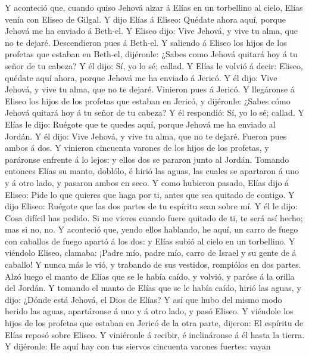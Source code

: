  Y aconteció que, cuando quiso Jehová alzar á Elías en un
torbellino al cielo, Elías venía con Eliseo de Gilgal.  Y
dijo Elías á Eliseo: Quédate ahora aquí, porque Jehová me ha enviado á
Beth-el. Y Eliseo dijo: Vive Jehová, y vive tu alma, que no te dejaré.
Descendieron pues á Beth-el.  Y saliendo á Eliseo los
hijos de los profetas que estaban en Beth-el, dijéronle: ¿Sabes como
Jehová quitará hoy á tu señor de tu cabeza? Y él dijo: Sí, yo lo sé;
callad.  Y Elías le volvió á decir: Eliseo, quédate aquí
ahora, porque Jehová me ha enviado á Jericó. Y él dijo: Vive Jehová, y
vive tu alma, que no te dejaré. Vinieron pues á Jericó.  Y
llegáronse á Eliseo los hijos de los profetas que estaban en Jericó, y
dijéronle: ¿Sabes cómo Jehová quitará hoy á tu señor de tu cabeza? Y él
respondió: Sí, yo lo sé; callad.  Y Elías le dijo: Ruégote
que te quedes aquí, porque Jehová me ha enviado al Jordán. Y él dijo:
Vive Jehová, y vive tu alma, que no te dejaré. Fueron pues ambos á dos.
 Y vinieron cincuenta varones de los hijos de los
profetas, y paráronse enfrente á lo lejos: y ellos dos se pararon junto
al Jordán.  Tomando entonces Elías su manto, doblólo, é
hirió las aguas, las cuales se apartaron á uno y á otro lado, y pasaron
ambos en seco.  Y como hubieron pasado, Elías dijo á
Eliseo: Pide lo que quieres que haga por ti, antes que sea quitado de
contigo. Y dijo Eliseo: Ruégote que las dos partes de tu espíritu sean
sobre mí.  Y él le dijo: Cosa difícil has pedido. Si me
vieres cuando fuere quitado de ti, te será así hecho; mas si no, no.
 Y aconteció que, yendo ellos hablando, he aquí, un carro
de fuego con caballos de fuego apartó á los dos: y Elías subió al cielo
en un torbellino.  Y viéndolo Eliseo, clamaba: ¡Padre
mío, padre mío, carro de Israel y su gente de á caballo! Y nunca más le
vió, y trabando de sus vestidos, rompiólos en dos partes.
 Alzó luego el manto de Elías que se le había caído, y
volvió, y paróse á la orilla del Jordán.  Y tomando el
manto de Elías que se le había caído, hirió las aguas, y dijo: ¿Dónde
está Jehová, el Dios de Elías? Y así que hubo del mismo modo herido las
aguas, apartáronse á uno y á otro lado, y pasó Eliseo.  Y
viéndole los hijos de los profetas que estaban en Jericó de la otra
parte, dijeron: El espíritu de Elías reposó sobre Eliseo. Y viniéronle á
recibir, é inclináronse á él hasta la tierra.  Y
dijéronle: He aquí hay con tus siervos cincuenta varones fuertes: vayan
